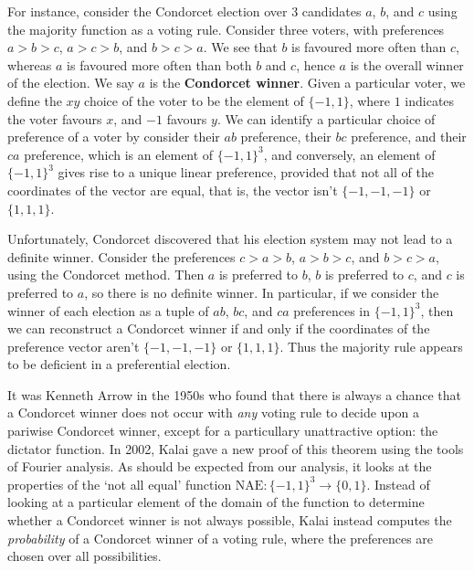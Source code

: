For instance, consider the Condorcet election over 3 candidates $a$, $b$, and $c$ using the majority function as a voting rule. Consider three voters, with preferences $a > b > c$, $a > c > b$, and $b > c > a$. We see that $b$ is favoured more often than $c$, whereas $a$ is favoured more often than both $b$ and $c$, hence $a$ is the overall winner of the election. We say $a$ is the {\bf Condorcet winner}. Given a particular voter, we define the $xy$ choice of the voter to be the element of $\{ -1, 1 \}$, where $1$ indicates the voter favours $x$, and $-1$ favours $y$. We can identify a particular choice of preference of a voter by consider their $ab$ preference, their $bc$ preference, and their $ca$ preference, which is an element of $\{ -1, 1 \}^3$, and conversely, an element of $\{ -1, 1 \}^3$ gives rise to a unique linear preference, provided that not all of the coordinates of the vector are equal, that is, the vector isn't $\{ -1, -1, -1 \}$ or $\{ 1, 1, 1 \}$.

Unfortunately, Condorcet discovered that his election system may not lead to a definite winner. Consider the preferences $c > a > b$, $a > b > c$, and $b > c > a$, using the Condorcet method. Then $a$ is preferred to $b$, $b$ is preferred to $c$, and $c$ is preferred to $a$, so there is no definite winner. In particular, if we consider the winner of each election as a tuple of $ab$, $bc$, and $ca$ preferences in $\{ -1, 1 \}^3$, then we can reconstruct a Condorcet winner if and only if the coordinates of the preference vector aren't $\{ -1, -1, -1 \}$ or $\{ 1, 1, 1 \}$. Thus the majority rule appears to be deficient in a preferential election.

It was Kenneth Arrow in the 1950s who found that there is always a chance that a Condorcet winner does not occur with {\it any} voting rule to decide upon a pariwise Condorcet winner, except for a particullary unattractive option: the dictator function. In 2002, Kalai gave a new proof of this theorem using the tools of Fourier analysis. As should be expected from our analysis, it looks at the properties of the `not all equal' function $\text{NAE}: \{ -1, 1 \}^3 \to \{ 0, 1 \}$. Instead of looking at a particular element of the domain of the function to determine whether a Condorcet winner is not always possible, Kalai instead computes the {\it probability} of a Condorcet winner of a voting rule, where the preferences are chosen over all possibilities. 

